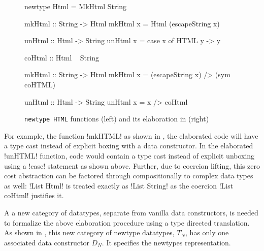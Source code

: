 \documentclass[screen,nonacm,manuscript,review]{acmart} %
\begin{document}
\begin{figure}[ht]
\centering
\begin{minipage}[ht]{0.5\linewidth}
\begin{CenteredBox}
\begin{code}
newtype Html = MkHtml String

mkHtml :: String -> Html
mkHtml x = Html (escapeString x)

unHtml :: Html -> String
unHtml x = case x of HTML y -> y
\end{code}
\end{CenteredBox}
\end{minipage}%
\begin{minipage}[ht]{0.5\linewidth}
\begin{CenteredBox}
\begin{code}
coHtml :: Html ~ String

mkHtml :: String -> Html
mkHtml x = (escapeString x) /> (sym coHTML)

unHtml :: Html -> String
unHtml x = x /> coHtml
\end{code}
\end{CenteredBox}
\end{minipage}
\caption[\lstinline{HTML}]{\lstinline{newtype HTML} functions (left) and its elaboration in \SFC (right)}
\label{fig:newtype-html-example}
\end{figure}

For example, the function !mkHTML!
as shown in , the elaborated \SFC
code will have a type cast instead of explicit boxing with a data constructor.
In the elaborated !unHTML! function, code would contain
a type cast instead of explicit unboxing using a !case! statement as shown above.
Further, due to coercion lifting, this zero cost abstraction can be factored through
compositionally to complex data types as well: !List Html! is treated exactly as !List String!
as the coercion !List coHtml! justifies it.

A a new category of datatypes, separate from vanilla data constructors, is needed
to formalize the above elaboration procedure using a type directed translation.
As shown in , this new category of newtype datatypes,
$T_N$, has only one associated data constructor $D_N$. It specifies the newtypes representation.
\end{document}
